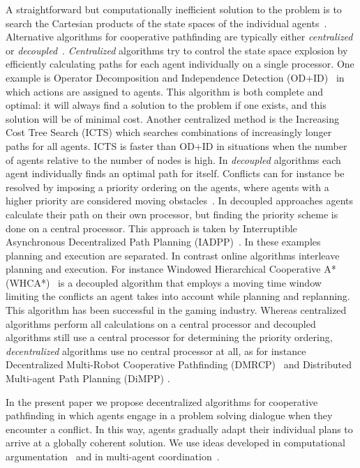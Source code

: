 A straightforward but computationally inefficient solution to the problem is to 
search the Cartesian products of the state spaces of the individual 
agents~\cite{hopcroft1984}. Alternative algorithms for cooperative pathfinding 
are typically either \emph{centralized} or \emph{decoupled}~\cite{latombe1991}.
\emph{Centralized} algorithms try to control the state space explosion by 
efficiently calculating paths for each agent individually on a single 
processor. One example is Operator Decomposition and Independence Detection 
(OD+ID)~\cite{standley2010,standley2011} in which actions are assigned to agents. 
This algorithm is both complete and 
optimal: it will always find a solution to the problem if one exists, and this 
solution will be of minimal cost.
Another centralized method is the Increasing Cost Tree 
Search (ICTS) \cite{sharon2013} which searches combinations of increasingly 
longer paths for all agents. ICTS is faster than OD+ID in situations when the 
number of agents relative to the number of nodes is high.
In \emph{decoupled} algorithms each agent individually finds an optimal path 
for itself. Conflicts can for instance be resolved by imposing a priority 
ordering on the agents, where agents with a higher priority are considered 
moving obstacles~\cite{bennewitz2002}.
In decoupled approaches agents calculate their path on their own processor, but finding the priority scheme is done on a central 
processor. This 
approach is taken by Interruptible Asynchronous Decentralized Path Planning 
(IADPP)~\cite{cap2012}.
In these examples planning and execution are separated. In contrast online algorithms 
interleave planning and execution. For instance Windowed Hierarchical Cooperative A* 
(WHCA*)~\cite{silver2005} is a decoupled algorithm that employs a moving time window limiting the 
conflicts an agent takes into account while planning and replanning. This 
algorithm has been successful in the gaming industry.
Whereas centralized algorithms perform all calculations on a central processor and decoupled algorithms still use a central processor for determining the priority ordering, \emph{decentralized} algorithms use no central processor at all, as for instance Decentralized 
Multi-Robot Cooperative Pathfinding (DMRCP)~\cite{wei2016} and Distributed 
Multi-agent Path Planning (DiMPP) \cite{chouhan2017}.

In the present paper we propose decentralized algorithms for cooperative 
pathfinding in which agents engage in a problem solving dialogue when they 
encounter a conflict. In this way, agents gradually adapt their individual 
plans to arrive at a globally coherent solution. We use ideas developed in 
computational argumentation~\cite{rahwanSimari2009} and in multi-agent 
coordination~\cite[pp.~202--204]{wooldridge2009}.

